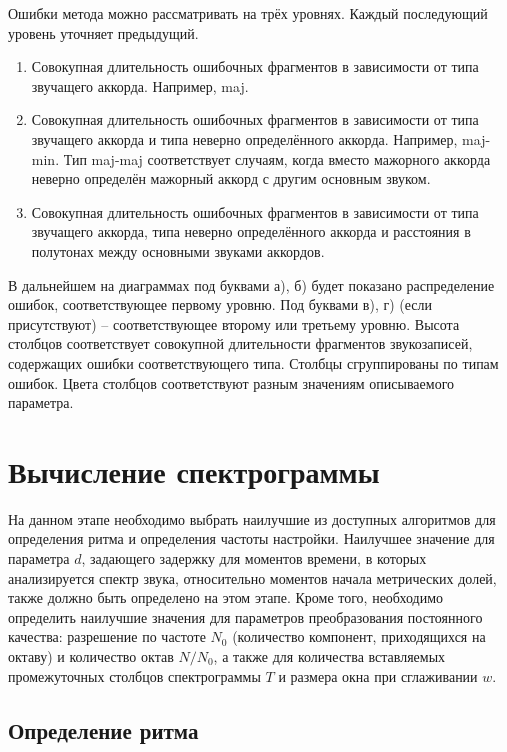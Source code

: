 Ошибки метода можно рассматривать на трёх уровнях. Каждый последующий уровень
уточняет предыдущий.
\begin{enumerate}
 \item Совокупная длительность ошибочных фрагментов в зависимости от типа
 звучащего аккорда. Например, maj.
 \item Совокупная длительность ошибочных фрагментов в зависимости от типа
 звучащего аккорда и типа неверно определённого аккорда. Например, maj-min.
 Тип maj-maj соответствует случаям, когда вместо мажорного аккорда неверно
 определён мажорный аккорд с другим основным звуком.
 \item Совокупная длительность ошибочных фрагментов в зависимости от типа
 звучащего аккорда, типа неверно определённого аккорда и расстояния в полутонах
 между основными звуками аккордов.
\end{enumerate}

В дальнейшем на диаграммах под буквами а), б) будет показано распределение
ошибок, соответствующее первому уровню. Под буквами в), г) (если
присутствуют) -- соответствующее второму или третьему уровню. Высота столбцов
соответствует совокупной длительности фрагментов звукозаписей, содержащих ошибки
соответствующего типа. Столбцы сгруппированы по типам ошибок. Цвета столбцов
соответствуют разным значениям описываемого параметра.

\section{Вычисление спектрограммы} \label{sect3_spectcalc}

На данном этапе необходимо выбрать наилучшие из доступных алгоритмов для
определения ритма и определения частоты настройки. Наилучшее значение
для параметра $d$, задающего задержку для моментов времени, в которых
анализируется спектр звука, относительно моментов начала метрических долей,
также должно быть определено на этом этапе. Кроме того, необходимо определить
наилучшие значения для параметров преобразования постоянного качества:
разрешение по частоте $N_0$ (количество компонент, приходящихся на октаву) и
количество октав $N / N_0$, а также для количества вставляемых промежуточных
столбцов спектрограммы $T$ и размера окна при сглаживании $w$.

\subsection{Определение ритма} \label{ssect3_beattrack}

